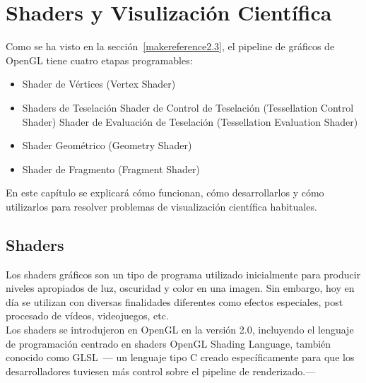 
\cleardoublepage


\chapter{Shaders y Visulización Científica}
\label{makereference3}

Como se ha visto en la sección~\ref{makereference2.3}, el pipeline de gráficos de
OpenGL tiene cuatro etapas programables:

\begin{itemize}
		\item Shader de Vértices (Vertex Shader)
		\item Shaders de Teselación
				\subitem Shader de Control de Teselación (Tessellation Control
				Shader)
				\subitem Shader de Evaluación de Teselación (Tessellation
				Evaluation Shader)
		\item Shader Geométrico (Geometry Shader)
		\item Shader de Fragmento (Fragment Shader)
\end{itemize}

En este capítulo se explicará cómo funcionan, cómo desarrollarlos y cómo
utilizarlos para resolver problemas de visualización científica habituales.

\section{Shaders}
\label{makereference3.1}

Los shaders gráficos son un tipo de programa utilizado inicialmente para
producir niveles apropiados de luz, oscuridad y color en una imagen. Sin
embargo, hoy en día se utilizan con diversas finalidades diferentes como efectos
especiales, post procesado de vídeos, videojuegos, etc.\\

Los shaders se introdujeron en OpenGL en la versión 2.0, incluyendo el lenguaje
de programación centrado en shaders OpenGL Shading Language, también conocido
como GLSL~\cite{GLSL}--- un lenguaje tipo C creado específicamente para que los
desarrolladores tuviesen más control sobre el pipeline de renderizado.---\\

